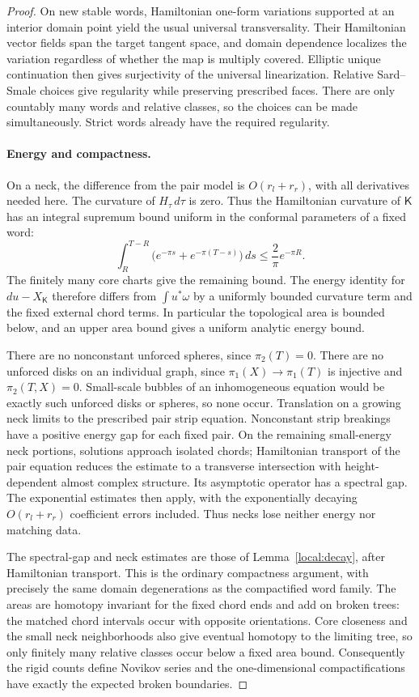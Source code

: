 \documentclass[11pt]{article}
\theoremstyle{definition}
\theoremstyle{remark}
\numberwithin{equation}{section}
\begin{document}
\begin{proof}
On new stable words, Hamiltonian one-form variations supported at an
interior domain point yield the usual universal transversality.
Their Hamiltonian vector fields span the target tangent space, and
domain dependence localizes the variation regardless of whether the
map is multiply covered.  Elliptic unique continuation then gives
surjectivity of the universal linearization.  Relative Sard--Smale
choices give regularity while preserving prescribed faces.  There are
only countably many words and relative classes, so the choices can
be made simultaneously.  Strict words already have the required
regularity.

\paragraph{Energy and compactness.}
On a neck, the difference from the pair model is
\(O(r_l+r_r)\), with all derivatives needed here.  The curvature of
\(H_\tau\,d\tau\) is zero.  Thus the Hamiltonian curvature of
\(\mathsf K\) has an integral supremum bound uniform in the conformal
parameters of a fixed word:
\[
 \int_R^{T-R}\bigl(e^{-\pi s}+e^{-\pi(T-s)}\bigr)\,ds
 \le \frac{2}{\pi}e^{-\pi R}.
\]
The finitely many core charts give the remaining bound.  The energy
identity for \(du-X_{\mathsf K}\) therefore differs from
\(\int u^*\omega\) by a uniformly bounded curvature term and the fixed
external chord terms.  In particular the topological area is bounded
below, and an upper area bound gives a uniform analytic energy bound.

There are no nonconstant unforced spheres, since \(\pi_2(T)=0\).
There are no unforced disks on an individual graph, since
\(\pi_1(X)\to\pi_1(T)\) is injective and
\(\pi_2(T,X)=0\).  Small-scale bubbles of an inhomogeneous equation would
be exactly such unforced disks or spheres, so none occur.
Translation on a growing neck limits to the prescribed pair strip
equation.  Nonconstant strip breakings have a positive energy gap for
each fixed pair.  On the remaining small-energy neck portions,
solutions approach isolated chords; Hamiltonian transport of the pair
equation reduces the estimate to a transverse intersection with
height-dependent almost complex structure.  Its asymptotic operator
has a spectral gap.  The exponential estimates then apply, with the
exponentially decaying \(O(r_l+r_r)\) coefficient errors included.
Thus necks lose neither energy nor matching data.

The spectral-gap and neck estimates are those of
Lemma~\ref{local:decay}, after Hamiltonian transport.
This is the ordinary compactness argument, with precisely the same
domain degenerations as the compactified word family.  The areas are
homotopy invariant for the fixed chord ends and add on broken trees:
the matched chord intervals occur with opposite orientations.  Core
closeness and the small neck neighborhoods also give eventual homotopy
to the limiting tree, so only finitely many relative classes occur
below a fixed area bound.  Consequently the rigid counts define
Novikov series and the one-dimensional compactifications have exactly
the expected broken boundaries.


\end{proof}
\end{document}
